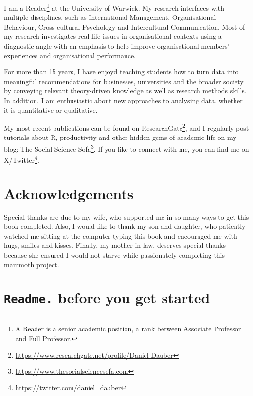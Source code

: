 \documentclass[
  letterpaper,
]{krantz}
\renewcommand{\href}[2]{#2\footnote{\url{#1}}}
\begin{document}

I am a Reader\footnote{A Reader is a senior academic position, a rank
  between Associate Professor and Full Professor.} at the University of
Warwick. My research interfaces with multiple disciplines, such as
International Management, Organisational Behaviour, Cross-cultural
Psychology and Intercultural Communication. Most of my research
investigates real-life issues in organisational contexts using a
diagnostic angle with an emphasis to help improve organisational
members' experiences and organisational performance.

For more than 15 years, I have enjoyd teaching students how to turn data
into meaningful recommendations for businesses, universities and the
broader society by conveying relevant theory-driven knowledge as well as
research methods skills. In addition, I am enthusiastic about new
approaches to analysing data, whether it is quantitative or qualitative.

My most recent publications can be found on
\href{https://www.researchgate.net/profile/Daniel-Dauber}{ResearchGate},
and I regularly post tutorials about R, productivity and other hidden
gems of academic life on my blog:
\href{https://www.thesocialsciencesofa.com}{The Social Science Sofa}. If
you like to connect with me, you can find me on
\href{https://twitter.com/daniel_dauber}{X/Twitter}.


\chapter*{Acknowledgements}\label{sec-acknowledgements}


Special thanks are due to my wife, who supported me in so many ways to
get this book completed. Also, I would like to thank my son and
daughter, who patiently watched me sitting at the computer typing this
book and encouraged me with hugs, smiles and kisses. Finally, my
mother-in-law, deserves special thanks because she ensured I would not
starve while passionately completing this mammoth project.


\chapter{\texorpdfstring{\texttt{Readme.} before you get
started}{Readme. before you get started}}\label{sec-readme-before-you-get-started}
\end{document}
